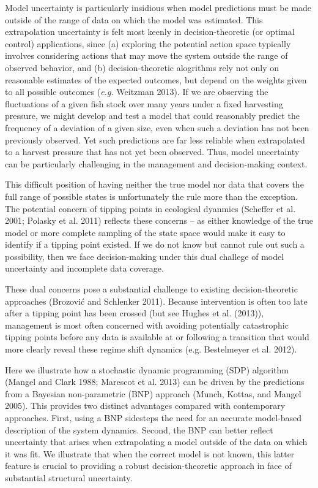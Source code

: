 \documentclass[author-year, review]{elsarticle} %
\begin{document}
Model uncertainty is particularly insidious when model predictions must
be made outside of the range of data on which the model was estimated.
This extrapolation uncertainty is felt most keenly in decision-theoretic
(or optimal control) applications, since (a) exploring the potential
action space typically involves considering actions that may move the
system outside the range of observed behavior, and (b)
decision-theoretic alogrithms rely not only on reasonable estimates of
the expected outcomes, but depend on the weights given to all possible
outcomes (\emph{e.g.} Weitzman 2013). If we are observing the
fluctuations of a given fish stock over many years under a fixed
harvesting pressure, we might develop and test a model that could
reasonably predict the frequency of a deviation of a given size, even
when such a deviation has not been previously observed. Yet such
predictions are far less reliable when extrapolated to a harvest
pressure that has not yet been observed. Thus, model uncertainty can be
particularly challenging in the management and decision-making context.

This difficult position of having neither the true model nor data that
covers the full range of possible states is unfortunately the rule more
than the exception. The potential concern of tipping points in
ecological dyanmics (Scheffer et al. 2001; Polasky et al. 2011) reflects
these concerns -- as either knowledge of the true model or more complete
sampling of the state space would make it easy to identify if a tipping
point existed. If we do not know but cannot rule out such a possibility,
then we face decision-making under this dual challege of model
uncertainty and incomplete data coverage.

These dual concerns pose a substantial challenge to existing
decision-theoretic approaches (Brozović and Schlenker 2011). Because
intervention is often too late after a tipping point has been crossed
(but see Hughes et al. (2013)), management is most often concerned with
avoiding potentially catastrophic tipping points before any data is
available at or following a transition that would more clearly reveal
these regime shift dynamics (e.g. Bestelmeyer et al. 2012).

Here we illustrate how a stochastic dynamic programming (SDP) algorithm
(Mangel and Clark 1988; Marescot et al. 2013) can be driven by the
predictions from a Bayesian non-parametric (BNP) approach (Munch,
Kottas, and Mangel 2005). This provides two distinct advantages compared
with contemporary approaches. First, using a BNP sidesteps the need for
an accurate model-based description of the system dynamics. Second, the
BNP can better reflect uncertainty that arises when extrapolating a
model outside of the data on which it was fit. We illustrate that when
the correct model is not known, this latter feature is crucial to
providing a robust decision-theoretic approach in face of substantial
structural uncertainty.
\end{document}
